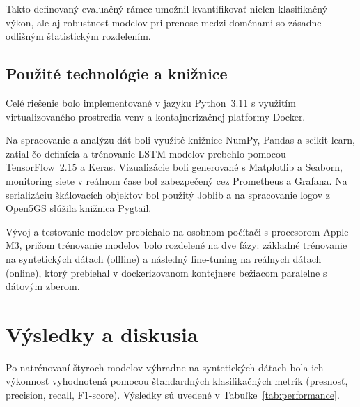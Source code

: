 \documentclass[a4paper,conference]{IEEEtran}
\begin{document}
Takto definovaný evaluačný rámec umožnil kvantifikovať nielen klasifikačný výkon, ale aj robustnosť modelov pri prenose medzi doménami so zásadne odlišným štatistickým rozdelením.

\subsection{Použité technológie a knižnice}
\label{subsec_tech}

Celé riešenie bolo implementované v jazyku Python~3.11 s využitím virtualizovaného prostredia venv a kontajnerizačnej platformy Docker.

Na spracovanie a analýzu dát boli využité knižnice NumPy, Pandas a scikit-learn, zatiaľ čo definícia a trénovanie LSTM modelov prebehlo pomocou TensorFlow~2.15 a Keras. Vizualizácie boli generované s Matplotlib a Seaborn, monitoring siete v reálnom čase bol zabezpečený cez Prometheus a Grafana. Na serializáciu škálovacích objektov bol použitý Joblib a na spracovanie logov z Open5GS slúžila knižnica Pygtail.


Vývoj a testovanie modelov prebiehalo na osobnom počítači s procesorom Apple M3, pričom trénovanie modelov bolo rozdelené na dve fázy: základné trénovanie na syntetických dátach (offline) a následný fine-tuning na reálnych dátach (online), ktorý prebiehal v dockerizovanom kontejnere bežiacom paralelne s dátovým zberom. 


\section{Výsledky a diskusia}
\label{sec_results}

Po natrénovaní štyroch modelov výhradne na syntetických dátach bola ich výkonnosť vyhodnotená pomocou štandardných klasifikačných metrík (presnosť, precision, recall, F1-score). Výsledky sú uvedené v Tabuľke~\ref{tab:performance}.
\end{document}
